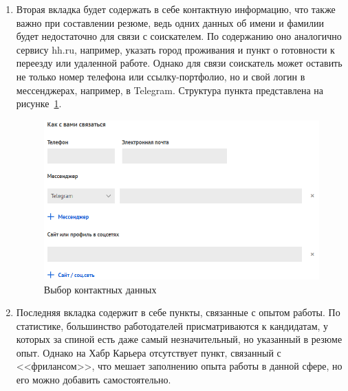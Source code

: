 \documentclass[master, och, diploma]{SCWorks}
\begin{document}
\begin{enumerate}
    \item Вторая вкладка будет содержать в себе контактную информацию, что также важно при составлении резюме, ведь одних данных об имени и фамилии будет недостаточно для связи с соискателем. По содержанию оно аналогично сервису hh.ru, например, указать город проживания и пункт о готовности к переезду или удаленной работе. Однако для связи соискатель может оставить не только номер телефона или ссылку-портфолио, но и свой логин в мессенджерах, например, в Telegram. Структура пункта представлена на рисунке~\ref{fig:8}.
    \begin{figure}[!ht]
        \centering
        \includegraphics[width=12cm]{images/image2.png}
        \caption{\label{fig:8}%
            Выбор контактных данных}
    \end{figure}

    \item Последняя вкладка содержит в себе пункты, связанные с опытом работы. По статистике, большинство работодателей присматриваются к кандидатам, у которых за спиной есть даже самый незначительный, но указанный в резюме опыт. Однако на Хабр Карьера отсутствует пункт, связанный с <<фрилансом>>, что мешает заполнению опыта работы в данной сфере, но его можно добавить самостоятельно.
\end{enumerate}
\end{document}
